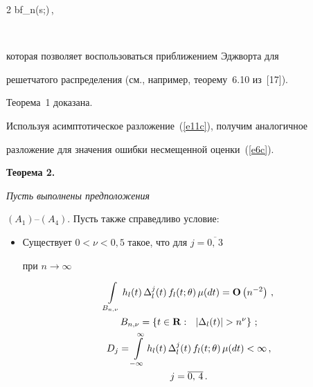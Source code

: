 \begin{multicols}{2}
     {b\cdot f_{n}(s;\theta)}\,,


  $$


  которая позволяет воспользоваться приближением Эджворта для


  решетчатого распределения (см., например, теорему~6.10 из~[17]).





  Теорема~1 доказана.





  Используя асимптотическое разложение~(\ref{e11c}), получим аналогичное


  разложение для значения ошибки несмещенной оценки~(\ref{e6c}).





  \medskip





\noindent


{\bf Теорема 2.} {\it Пусть выполнены предположения


  $(A_1)$--$(A_4)$. Пусть также справедливо условие:


  {\addtolength{\leftmargini}{10pt}


  \begin{itemize}


  \item[\sffamily $(A_5).$]


  Существует $0<\nu<0{,}5$ такое, что для $j=\overline{0,\,3}$


  при $n\rightarrow\infty$


  \begin{gather} 


\int\limits_{B_{n,\nu}}  h_l(t)\, \Delta_l^j(t)\,


     f_l(t;\theta)\, \mu(dt)={\bf O}\left(n^{-2}\right)\,,\notag\\


B_{n,\nu}=\left\{t\in{\bf R}:~~|\Delta_l(t)|>n^{\nu}\right\}\,;\notag\\


 D_j=\int\limits_{-\infty}^\infty


     h_l(t)\, \Delta_l^j(t)\, f_l(t;\theta)\,


\mu(dt)<\infty\,,\notag\\


j=\overline{0,\,4}\,.\label{e15c}


\end{gather}



\end{itemize}}}
\end{multicols}
